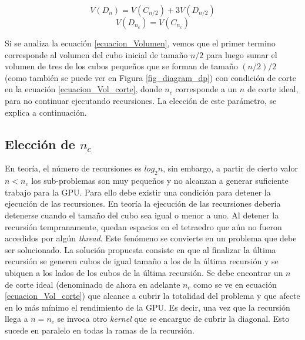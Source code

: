 \documentclass[10pt, conference, compsocconf, onecolumn]{IEEEtran}
\begin{document}
\begin{equation}
\label{ecuacion_Volumen}
V(D_{n}) =  V(C_{n/2}) + 3V(D_{n/2})
\end{equation}
\begin{equation}
\label{ecuacion_Vol_corte}
\textbf{}V(D_{n_{c}})=V(C_{n_{c}})
\end{equation}
 
 
 
 Si se analiza la ecuaci\'on \ref{ecuacion_Volumen}, vemos que el primer termino corresponde al volumen del cubo inicial de tama\~no $n/2$ para luego sumar el volumen de tres de los cubos peque\~nos que se forman de tama\~no $(n/2)/2$ (como tambi\'en se puede ver en Figura \ref{fig_diagram_dp}) con condici\'on de corte en la ecuaci\'on \ref{ecuacion_Vol_corte}, donde $n_{c}$ corresponde a un $n$ de corte ideal, para no continuar ejecutando recursiones. La elecci\'on de este par\'ametro, se explica a continuaci\'on.
 

 
\subsection{Elecci\'on de $n_{c}$ }
\label{Exp_nCORTE}


En teor\'ia, el n\'umero de recursiones es $log_{2} n$, sin embargo, a partir de cierto valor $n<n_{c}$ los sub-problemas son muy peque\~nos y no alcanzan a generar suficiente trabajo para la GPU. Para ello debe existir una condici\'on para detener la ejecuci\'on de las recursiones. En teor\'ia la ejecuci\'on de las recursiones deber\'ia detenerse cuando el tama\~no del cubo sea igual o menor a uno. Al detener la recursi\'on tempranamente, quedan espacios en el tetraedro que a\'un no fueron accedidos por alg\'un \textit{thread}. Este fen\'omeno se convierte en un problema que debe ser solucionado. La soluci\'on propuesta consiste en que al finalizar la \'ultima recursi\'on se generen cubos de igual tama\~no a los de la \'ultima recursi\'on y se ubiquen a los lados de los cubos de la \'ultima recursi\'on. Se debe encontrar un $n$ de corte ideal (denominado de ahora en adelante $n_{c}$ como se ve en ecuaci\'on \ref{ecuacion_Vol_corte}) que alcance a cubrir la totalidad del problema y que afecte en lo m\'as m\'inimo el rendimiento de la GPU. Es decir, una vez que la recursi\'on llega a $n=n_{c}$ se invoca otro \textit{kernel} que se encargue de cubrir la diagonal. Esto sucede en paralelo en todas la ramas de la recursi\'on.
\end{document}
